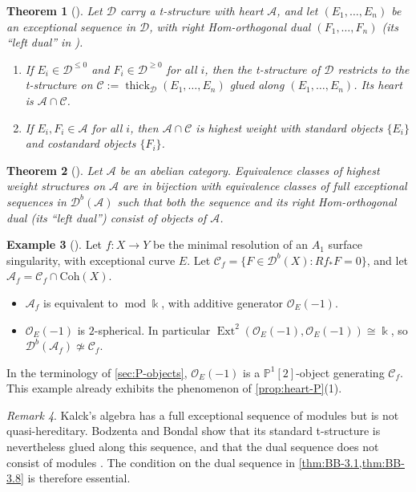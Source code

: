 \documentclass[11pt,reqno]{amsart}
\theoremstyle{plain}
\newtheorem{theorem}{Theorem}[section]
\theoremstyle{definition}
\newtheorem{example}[theorem]{Example}
\theoremstyle{remark}
\newtheorem{remark}[theorem]{Remark}
\newcommand{\kk}{\Bbbk}
\DeclareMathOperator{\Ext}{Ext}
\newcommand{\modd}{\operatorname{mod}}
\newcommand{\Db}{\mathcal{D}^b}
\newcommand{\thick}[2][\cD]{\operatorname{thick}_{#1}(#2)}
\newcommand{\Pn}[2]{\mathbb{P}^{#1}[#2]}
\newcommand{\cD}{\mathcal{D}}
\newcommand{\cA}{\mathcal{A}}
\newcommand{\cC}{\mathcal{C}}
\newcommand{\cO}{\mathcal{O}}
\begin{document}
\begin{theorem}[{\cite[Thm.~3.4]{BB26}}]\label{thm:BB-3.4}
Let $\cD$ carry a t-structure with heart $\cA$, and let $(E_1,\dots,E_n)$ be an exceptional sequence in $\cD$, with right Hom-orthogonal dual $(F_1,\dots,F_n)$ (its ``left dual'' in \cite{BB26}).
\begin{enumerate}
\item If $E_i\in\cD^{\le0}$ and $F_i\in\cD^{\ge0}$ for all $i$, then the t-structure of $\cD$ restricts to the t-structure on $\cC:=\thick{E_1,\dots,E_n}$ glued along $(E_1,\dots,E_n)$. Its heart is $\cA\cap\cC$.
\item If $E_i,F_i\in\cA$ for all $i$, then $\cA\cap\cC$ is highest weight with standard objects $\{E_i\}$ and costandard objects $\{F_i\}$.
\end{enumerate}
\end{theorem}

\begin{theorem}[{\cite[Thm.~3.8]{BB26}}]\label{thm:BB-3.8}
Let $\cA$ be an abelian category. Equivalence classes of highest weight structures on $\cA$ are in bijection with equivalence classes of full exceptional sequences in $\Db(\cA)$ such that both the sequence and its right Hom-orthogonal dual (its ``left dual'') consist of objects of $\cA$.
\end{theorem}

\begin{example}[{\cite[Ex.~5.11]{BB26}}]\label{ex:BB-5.11}
Let $f\colon X\to Y$ be the minimal resolution of an $A_1$ surface singularity, with exceptional curve $E$. Let $\cC_f=\{F\in\Db(X):Rf_*F=0\}$, and let $\mathcal{A}_f=\cC_f\cap\mathrm{Coh}(X)$.
\begin{itemize}
\item $\mathcal{A}_f$ is equivalent to $\modd\kk$, with additive generator $\cO_E(-1)$.
\item $\cO_E(-1)$ is $2$-spherical. In particular $\Ext^2(\cO_E(-1),\cO_E(-1))\cong\kk$, so $\Db(\mathcal{A}_f)\not\simeq\cC_f$.
\end{itemize}
In the terminology of \cref{sec:P-objects}, $\cO_E(-1)$ is a $\Pn12$-object generating $\cC_f$. This example already exhibits the phenomenon of \cref{prop:heart-P}(1).
\end{example}

\begin{remark}
Kalck's algebra \cite[Prop.~5.6]{Kal17} has a full exceptional sequence of modules but is not quasi-hereditary. Bodzenta and Bondal show that its standard t-structure is nevertheless glued along this sequence, and that the dual sequence does not consist of modules \cite[\S4.1]{BB26}. The condition on the dual sequence in \cref{thm:BB-3.1,thm:BB-3.8} is therefore essential.
\end{remark}
\end{document}
